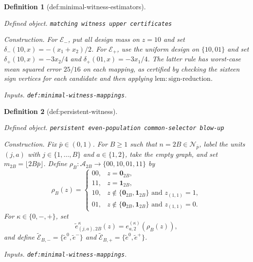 \documentclass{article}
\newtheorem{definition}{Definition}
\begin{document}
\begin{definition}[def:minimal-witness-estimators]\label{def:minimal-witness-estimators}
\par\smallskip\noindent\emph{Defined object.} \texttt{matching witness upper certificates}
\par\smallskip\noindent\emph{Construction.} For \(\mathcal E_-\), put all design mass on \(z=10\) and set \(\delta_-(10,x)=-(x_1+x_2)/2\). For \(\mathcal E_+\), use the uniform design on \(\{10,01\}\) and set \(\delta_+(10,x)=-3x_2/4\) and \(\delta_+(01,x)=-3x_1/4\). The latter rule has worst-case mean squared error \(25/16\) on each mapping, as certified by checking the sixteen sign vertices for each candidate and then applying \(\mathrm{lem{:}sign\text{-}reduction}\).
\par\smallskip\noindent\emph{Inputs.} \texttt{def:\allowbreak{}minimal-\allowbreak{}witness-\allowbreak{}mappings}.
\end{definition}

\begin{definition}[def:persistent-witness]\label{def:persistent-witness}
\par\smallskip\noindent\emph{Defined object.} \texttt{persistent even-\allowbreak{}population common-\allowbreak{}selector blow-\allowbreak{}up}
\par\smallskip\noindent\emph{Construction.} Fix \(\bar p\in(0,1)\).  For \(B\ge1\) such that \(n=2B\in\mathcal N_{\bar p}\), label the units \((j,a)\) with \(j\in\{1,\ldots,B\}\) and \(a\in\{1,2\}\), take the empty graph, and set \(m_{2B}=\lfloor2B\bar p\rfloor\).  Define \(\rho_B:\mathcal A_{2B}\to\{00,10,01,11\}\) by
\[
 \rho_B(z)=
 \begin{cases}
 00,&z=\mathbf 0_{2B},\\
 11,&z=\mathbf 1_{2B},\\
 10,&z\notin\{\mathbf 0_{2B},\mathbf 1_{2B}\}\text{ and }z_{(1,1)}=1,\\
 01,&z\notin\{\mathbf 0_{2B},\mathbf 1_{2B}\}\text{ and }z_{(1,1)}=0.
 \end{cases}
\]
For \(\kappa\in\{0,-,+\}\), set
\[
 \widetilde e^{\kappa}_{(j,a),2B}(z)
 =e^{(\kappa)}_{a,2}(\rho_B(z)),
\]
and define \(\widetilde{\mathcal E}_{B,-}=\{\widetilde e^0,\widetilde e^-\}\) and \(\widetilde{\mathcal E}_{B,+}=\{\widetilde e^0,\widetilde e^+\}\).
\par\smallskip\noindent\emph{Inputs.} \texttt{def:\allowbreak{}minimal-\allowbreak{}witness-\allowbreak{}mappings}.
\end{definition}
\end{document}
